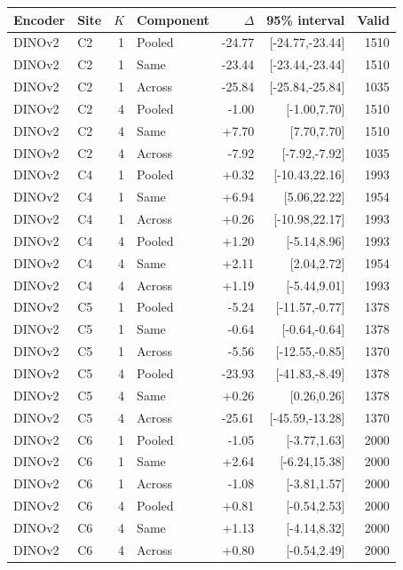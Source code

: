 \begingroup\small\setlength{\tabcolsep}{4pt}
\begin{longtable}{llrlrrr}
\toprule
Encoder & Site & $K$ & Component & $\Delta$ & 95\% interval & Valid \\ \midrule
DINOv2 & C2 & 1 & Pooled & -24.77 & [-24.77,-23.44] & 1510 \\
DINOv2 & C2 & 1 & Same & -23.44 & [-23.44,-23.44] & 1510 \\
DINOv2 & C2 & 1 & Across & -25.84 & [-25.84,-25.84] & 1035 \\
DINOv2 & C2 & 4 & Pooled & -1.00 & [-1.00,7.70] & 1510 \\
DINOv2 & C2 & 4 & Same & +7.70 & [7.70,7.70] & 1510 \\
DINOv2 & C2 & 4 & Across & -7.92 & [-7.92,-7.92] & 1035 \\
DINOv2 & C4 & 1 & Pooled & +0.32 & [-10.43,22.16] & 1993 \\
DINOv2 & C4 & 1 & Same & +6.94 & [5.06,22.22] & 1954 \\
DINOv2 & C4 & 1 & Across & +0.26 & [-10.98,22.17] & 1993 \\
DINOv2 & C4 & 4 & Pooled & +1.20 & [-5.14,8.96] & 1993 \\
DINOv2 & C4 & 4 & Same & +2.11 & [2.04,2.72] & 1954 \\
DINOv2 & C4 & 4 & Across & +1.19 & [-5.44,9.01] & 1993 \\
DINOv2 & C5 & 1 & Pooled & -5.24 & [-11.57,-0.77] & 1378 \\
DINOv2 & C5 & 1 & Same & -0.64 & [-0.64,-0.64] & 1378 \\
DINOv2 & C5 & 1 & Across & -5.56 & [-12.55,-0.85] & 1370 \\
DINOv2 & C5 & 4 & Pooled & -23.93 & [-41.83,-8.49] & 1378 \\
DINOv2 & C5 & 4 & Same & +0.26 & [0.26,0.26] & 1378 \\
DINOv2 & C5 & 4 & Across & -25.61 & [-45.59,-13.28] & 1370 \\
DINOv2 & C6 & 1 & Pooled & -1.05 & [-3.77,1.63] & 2000 \\
DINOv2 & C6 & 1 & Same & +2.64 & [-6.24,15.38] & 2000 \\
DINOv2 & C6 & 1 & Across & -1.08 & [-3.81,1.57] & 2000 \\
DINOv2 & C6 & 4 & Pooled & +0.81 & [-0.54,2.53] & 2000 \\
DINOv2 & C6 & 4 & Same & +1.13 & [-4.14,8.32] & 2000 \\
DINOv2 & C6 & 4 & Across & +0.80 & [-0.54,2.49] & 2000 \\

\end{longtable}
